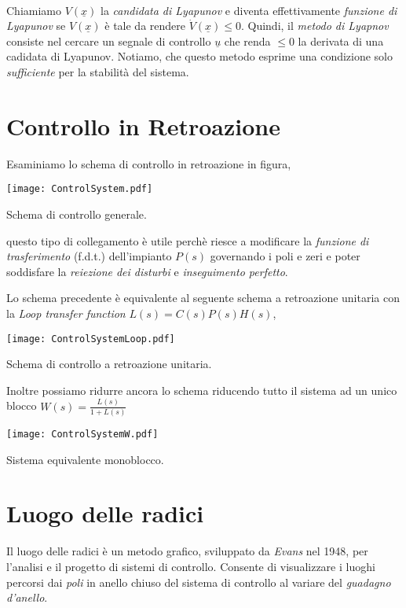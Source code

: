 \paragraph{}
Chiamiamo $V(\underline{x})$ la \emph{candidata di Lyapunov} e diventa effettivamente \emph{funzione di Lyapunov} se $V(\underline{x})$ è tale da rendere $\dot{V}(\underline{x}) \leqslant 0$. Quindi, il \emph{metodo di Lyapnov} consiste nel cercare un segnale di controllo $\underline{u}$ che renda $\leqslant 0$ la derivata di una cadidata di Lyapunov. Notiamo, che questo metodo esprime una condizione solo \emph{sufficiente} per la stabilità del sistema.

\section{Controllo in Retroazione}
Esaminiamo lo schema di controllo in retroazione in figura,
\begin{center}
	\texttt{[image: ControlSystem.pdf]}
	\caption{Schema di controllo generale.}
\end{center}
questo tipo di collegamento è utile perchè riesce a modificare la \emph{funzione di trasferimento} (f.d.t.) dell'impianto $P(s)$ governando i poli e zeri e poter soddisfare la \emph{reiezione dei disturbi} e \emph{inseguimento perfetto}. 

Lo schema precedente è equivalente al seguente schema a retroazione unitaria con la \emph{Loop transfer function} $L(s) = C(s)P(s)H(s)$,
\begin{center}
	\texttt{[image: ControlSystemLoop.pdf]}
	\caption{Schema di controllo a retroazione unitaria.}
\end{center}

Inoltre possiamo ridurre ancora lo schema riducendo tutto il sistema ad un unico blocco $W(s) = \frac{L(s)}{1 + L(s)}$
\begin{center}
	\texttt{[image: ControlSystemW.pdf]}
	\caption{Sistema equivalente monoblocco.}
\end{center}

\section{Luogo delle radici}
Il luogo delle radici è un metodo grafico, sviluppato da \emph{Evans} nel 1948, per l'analisi e il progetto di sistemi di controllo. Consente di visualizzare i luoghi percorsi dai \emph{poli} in anello chiuso del sistema di controllo al variare del \emph{guadagno d'anello}. 

